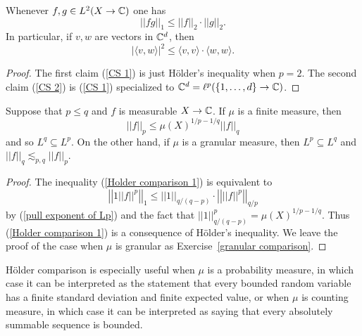 \begin{corollary}
Whenever $f, g \in L^2(X \to \mathbb{C})$ one has
\begin{equation}
\label{CS 1}
||fg||_1 \leq ||f||_2 \cdot ||g||_2.
\end{equation}
In particular, if $v, w$ are vectors in $\mathbb{C}^d$, then
\begin{equation}
\label{CS 2}
|\langle v, w\rangle|^2 \leq \langle v, v\rangle \cdot \langle w, w\rangle.
\end{equation}
\end{corollary}
\begin{proof}
The first claim (\ref{CS 1}) is just H\"older's inequality when $p = 2$.
The second claim (\ref{CS 2}) is (\ref{CS 1}) specialized to $\mathbb{C}^{d} = \ell^p(\{1, \dots, d\} \to \mathbb{C})$.
\end{proof}

\begin{corollary}
\label{Holder comparison}
Suppose that $p \leq q$ and $f$ is measurable $X \to \mathbb{C}$.
If $\mu$ is a finite measure, then
\begin{equation}
\label{Holder comparison 1}
||f||_{p}  \leq \mu(X)^{1/p-1/q} ||f||_q
\end{equation}
and so $L^{q} \subseteq L^p$.
On the other hand, if $\mu$ is a granular measure, then $L^{p} \subseteq L^q$ and $||f||_{q} \lesssim_{p,q} ||f||_{p} $.
\end{corollary}
\begin{proof}
The inequality (\ref{Holder comparison 1}) is equivalent to
\[\left|\left|1 ||f||^p\right|\right|_1 \leq ||1||_{q/(q-p)} \cdot \left|\left| ||f||^p\right|\right|_{q/p}\]
by (\ref{pull exponent of Lp}) and the fact that $||1||_{q/(q-p)}^{p} = \mu(X)^{1/p-1/q}$.
Thus (\ref{Holder comparison 1}) is a consequence of H\"older's inequality.
We leave the proof of the case when $\mu$ is granular as Exercise~\ref{granular comparison}.
\end{proof}

H\"older comparison is especially useful when $\mu$ is a probability measure, in which case it can be interpreted as the statement that every bounded random variable has a finite standard deviation and finite expected value, or when $\mu$ is counting measure, in which case it can be interpreted as saying that every absolutely summable sequence is bounded.

